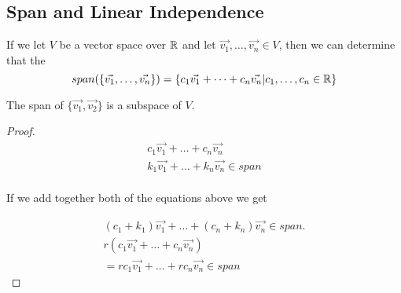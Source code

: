 \subsection{Span and Linear Independence}

  If we let $V$ be a vector space over $\mathbb{R}$ and let $\vec{v_1},\dots,\vec{v_n}\in V$, then we can determine that the 
  \[
    span(\{\vec{v_1},\dots,\vec{v_n}\})=\{c_1\vec{v_1}+\dots+c_n\vec{v_n}|c_1,\dots,c_n\in\mathbb{R}\}
  \]

  \begin{prop}
    The span of $\{\vec{v_1},\vec{v_2}\}$ is a subspace of $V$.
    \begin{proof}
      \begin{align*}
        c_1\vec{v_1}+\dots+c_n\vec{v_n}\\
        k_1\vec{v_1}+\dots+k_n\vec{v_n}\in span\\
      \end{align*}

      If we add together both of the equations above we get

      \begin{align*}
        (c_1+k_1)\vec{v_1}+\dots+(c_n+k_n)\vec{v_n}\in span.\\
        r(c_1\vec{v_1}+\dots+c_n\vec{v_n})\\
        =rc_1\vec{v_1}+\dots+rc_n\vec{v_n}\in span
      \end{align*}
    \end{proof}
  \end{prop}

